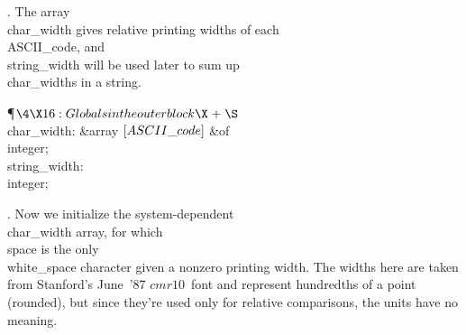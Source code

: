 .
The array \\{char\_width} gives relative printing widths of each
\\{ASCII\_code}, and \\{string\_width} will be used later to sum up
\\{char\_width}s in a string.

\Y\P$\4\X16:Globals in the outer block\X\mathrel{+}\S$\6
\4\\{char\_width}: \&{array} $[\\{ASCII\_code}]$ \1\&{of}\5
\\{integer};\2\6
\4\\{string\_width}: \\{integer};\par
\fi

.
Now we initialize the system-dependent \\{char\_width} array, for which
\\{space} is the only \\{white\_space} character given a nonzero printing
width.  The widths here are taken from Stanford's June~'87
$cmr10$~font and represent hundredths of a point (rounded), but since
they're used only for relative comparisons, the units have no meaning.

